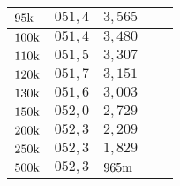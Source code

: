 \begin{table}[H]
\begin{tabular}{l||l|l||l|l|}
\multicolumn{1}{|l||}{$95\text{k}$}                      &$ 051,4     $&$ 3,565       $&$             $&$              $\\ \hline
\multicolumn{1}{|l||}{$100\text{k}$}                     &$ 051,4     $&$ 3,480       $&$             $&$              $\\ \hline
\multicolumn{1}{|l||}{$110\text{k}$}                     &$ 051,5     $&$ 3,307       $&$             $&$              $\\ \hline
\multicolumn{1}{|l||}{$120\text{k}$}                     &$ 051,7     $&$ 3,151       $&$             $&$              $\\ \hline
\multicolumn{1}{|l||}{$130\text{k}$}                     &$ 051,6     $&$ 3,003       $&$             $&$              $\\ \hline
\multicolumn{1}{|l||}{$150\text{k}$}                     &$ 052,0     $&$ 2,729       $&$             $&$              $\\ \hline
\multicolumn{1}{|l||}{$200\text{k}$}                     &$ 052,3     $&$ 2,209       $&$             $&$              $\\ \hline
\multicolumn{1}{|l||}{$250\text{k}$}                     &$ 052,3     $&$ 1,829       $&$             $&$              $\\ \hline
\multicolumn{1}{|l||}{$500\text{k}$}                     &$ 052,3     $&$ 965\text{m}      $&$             $&$              $\\ \hline
\end{tabular}
\end{table}